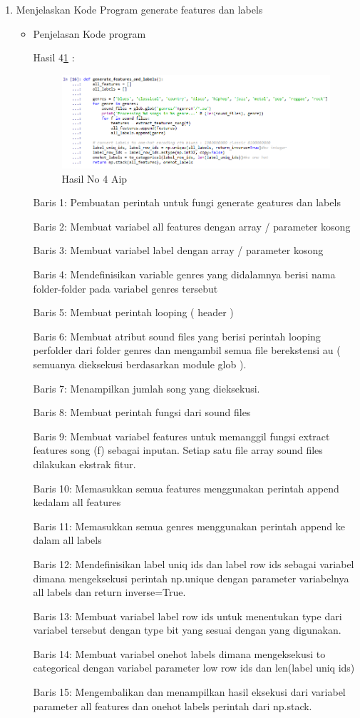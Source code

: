 \begin{enumerate}
\item Menjelaskan Kode Program generate features dan labels 
\begin{itemize}
\item Penjelasan Kode program
\par Hasil 4\ref{hasil4} :
\begin{figure}[ht]
\centering
\includegraphics[scale=0.7]{figures/AIP/no4aip.PNG}
\caption{Hasil No 4 Aip}
\label{hasil4}
\end{figure}
\par Baris 1: Pembuatan perintah untuk fungi generate geatures dan labels
\par Baris 2: Membuat variabel all features dengan array / parameter kosong
\par Baris 3: Membuat variabel label dengan array / parameter kosong
\par Baris 4: Mendefinisikan variable genres yang didalamnya berisi nama folder-folder pada variabel genres tersebut
\par Baris 5: Membuat perintah looping ( header )
\par Baris 6: Membuat atribut sound files yang berisi perintah looping perfolder dari folder genres dan mengambil semua file berekstensi au ( semuanya dieksekusi berdasarkan module glob ).
\par Baris 7: Menampilkan jumlah song yang dieksekusi.
\par Baris 8: Membuat perintah fungsi dari sound files
\par Baris 9: Membuat variabel features untuk memanggil fungsi extract features song (f) sebagai inputan. Setiap satu file array sound files dilakukan ekstrak fitur.
\par Baris 10: Memasukkan semua features menggunakan perintah append kedalam all features
\par Baris 11: Memasukkan semua genres menggunakan perintah append ke dalam all labels
\par Baris 12: Mendefinisikan label uniq ids dan label row ids sebagai variabel dimana mengeksekusi perintah np.unique dengan parameter variabelnya all labels dan return inverse=True.
\par Baris 13: Membuat variabel label row ids untuk menentukan type dari variabel tersebut dengan type bit yang sesuai dengan yang digunakan.
\par Baris 14: Membuat variabel onehot labels dimana mengeksekusi to categorical dengan variabel parameter low row ids dan len(label uniq ids)
\par Baris 15: Mengembalikan dan menampilkan hasil eksekusi dari variabel parameter all features dan onehot labels perintah dari np.stack.
\end{itemize}
\par



\end{enumerate}
